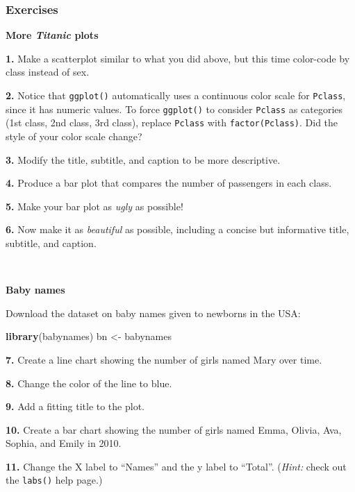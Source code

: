 \documentclass[
]{book}
\newenvironment{Shaded}{\begin{snugshade}}{\end{snugshade}}
\newcommand{\FunctionTok}[1]{\textcolor[rgb]{0.13,0.29,0.53}{\textbf{#1}}}
\newcommand{\NormalTok}[1]{#1}
\newcommand{\OtherTok}[1]{\textcolor[rgb]{0.56,0.35,0.01}{#1}}
\begin{document}
\subsubsection*{Exercises}\label{exercises-8}

\textbf{More \emph{Titanic} plots}

\textbf{1.} Make a scatterplot similar to what you did above, but this time color-code by class instead of sex.

\textbf{2.} Notice that \texttt{ggplot()} automatically uses a continuous color scale for \texttt{Pclass}, since it has numeric values. To force \texttt{ggplot()} to consider \texttt{Pclass} as categories (1st class, 2nd class, 3rd class), replace \texttt{Pclass} with \texttt{factor(Pclass)}. Did the style of your color scale change?

\textbf{3.} Modify the title, subtitle, and caption to be more descriptive.

\textbf{4.} Produce a bar plot that compares the number of passengers in each class.

\textbf{5.} Make your bar plot as \emph{ugly} as possible!

\textbf{6.} Now make it as \emph{beautiful} as possible, including a concise but informative title, subtitle, and caption.

~

\textbf{Baby names}

Download the dataset on baby names given to newborns in the USA:

\begin{Shaded}
\begin{Highlighting}[]
\FunctionTok{library}\NormalTok{(babynames)}
\NormalTok{bn }\OtherTok{\textless{}{-}}\NormalTok{ babynames}
\end{Highlighting}
\end{Shaded}

\textbf{7.} Create a line chart showing the number of girls named Mary over time.

\textbf{8.} Change the color of the line to blue.

\textbf{9.} Add a fitting title to the plot.

\textbf{10.} Create a bar chart showing the number of girls named Emma, Olivia, Ava, Sophia, and Emily in 2010.

\textbf{11.} Change the X label to ``Names'' and the y label to ``Total''. (\emph{Hint:} check out the \texttt{labs()} help page.)
\end{document}
